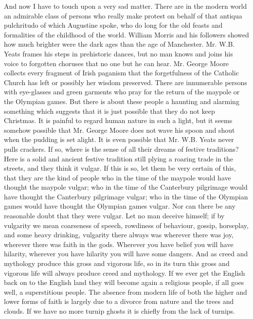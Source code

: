 And now I have to touch upon a very sad matter. There are in the modern world an admirable class of persons who really make protest on behalf of that antiqua pulchritudo of which Augustine spoke, who do long for the old feasts and formalities of the childhood of the world. William Morris and his followers showed how much brighter were the dark ages than the age of Manchester. Mr. W.B. Yeats frames his steps in prehistoric dances, but no man knows and joins his voice to forgotten choruses that no one but he can hear. Mr. George Moore collects every fragment of Irish paganism that the forgetfulness of the Catholic Church has left or possibly her wisdom preserved. There are innumerable persons with eye-glasses and green garments who pray for the return of the maypole or the Olympian games. But there is about these people a haunting and alarming something which suggests that it is just possible that they do not keep Christmas. It is painful to regard human nature in such a light, but it seems somehow possible that Mr. George Moore does not wave his spoon and shout when the pudding is set alight. It is even possible that Mr. W.B. Yeats never pulls crackers. If so, where is the sense of all their dreams of festive traditions? Here is a solid and ancient festive tradition still plying a roaring trade in the streets, and they think it vulgar. If this is so, let them be very certain of this, that they are the kind of people who in the time of the maypole would have thought the maypole vulgar; who in the time of the Canterbury pilgrimage would have thought the Canterbury pilgrimage vulgar; who in the time of the Olympian games would have thought the Olympian games vulgar. Nor can there be any reasonable doubt that they were vulgar. Let no man deceive himself; if by vulgarity we mean coarseness of speech, rowdiness of behaviour, gossip, horseplay, and some heavy drinking, vulgarity there always was wherever there was joy, wherever there was faith in the gods. Wherever you have belief you will have hilarity, wherever you have hilarity you will have some dangers. And as creed and mythology produce this gross and vigorous life, so in its turn this gross and vigorous life will always produce creed and mythology. If we ever get the English back on to the English land they will become again a religious people, if all goes well, a superstitious people. The absence from modern life of both the higher and lower forms of faith is largely due to a divorce from nature and the trees and clouds. If we have no more turnip ghosts it is chiefly from the lack of turnips.


